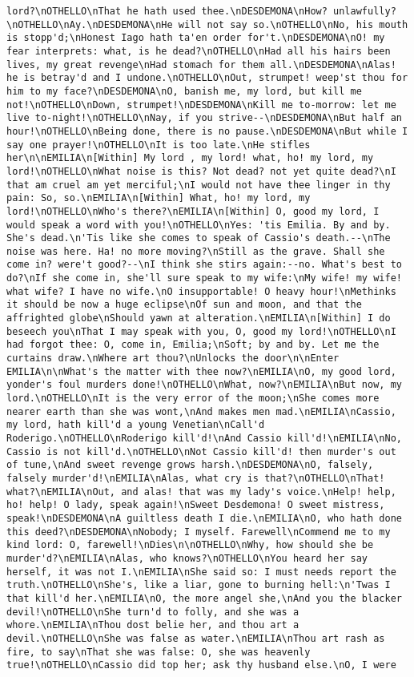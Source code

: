 \begin{verbatim}
lord?\nOTHELLO\nThat he hath used thee.\nDESDEMONA\nHow? unlawfully?\nOTHELLO\nAy.\nDESDEMONA\nHe will not say so.\nOTHELLO\nNo, his mouth is stopp'd;\nHonest Iago hath ta'en order for't.\nDESDEMONA\nO! my fear interprets: what, is he dead?\nOTHELLO\nHad all his hairs been lives, my great revenge\nHad stomach for them all.\nDESDEMONA\nAlas! he is betray'd and I undone.\nOTHELLO\nOut, strumpet! weep'st thou for him to my face?\nDESDEMONA\nO, banish me, my lord, but kill me not!\nOTHELLO\nDown, strumpet!\nDESDEMONA\nKill me to-morrow: let me live to-night!\nOTHELLO\nNay, if you strive--\nDESDEMONA\nBut half an hour!\nOTHELLO\nBeing done, there is no pause.\nDESDEMONA\nBut while I say one prayer!\nOTHELLO\nIt is too late.\nHe stifles her\n\nEMILIA\n[Within] My lord , my lord! what, ho! my lord, my lord!\nOTHELLO\nWhat noise is this? Not dead? not yet quite dead?\nI that am cruel am yet merciful;\nI would not have thee linger in thy pain: So, so.\nEMILIA\n[Within] What, ho! my lord, my lord!\nOTHELLO\nWho's there?\nEMILIA\n[Within] O, good my lord, I would speak a word with you!\nOTHELLO\nYes: 'tis Emilia. By and by. She's dead.\n'Tis like she comes to speak of Cassio's death.--\nThe noise was here. Ha! no more moving?\nStill as the grave. Shall she come in? were't good?--\nI think she stirs again:--no. What's best to do?\nIf she come in, she'll sure speak to my wife:\nMy wife! my wife! what wife? I have no wife.\nO insupportable! O heavy hour!\nMethinks it should be now a huge eclipse\nOf sun and moon, and that the affrighted globe\nShould yawn at alteration.\nEMILIA\n[Within] I do beseech you\nThat I may speak with you, O, good my lord!\nOTHELLO\nI had forgot thee: O, come in, Emilia;\nSoft; by and by. Let me the curtains draw.\nWhere art thou?\nUnlocks the door\n\nEnter EMILIA\n\nWhat's the matter with thee now?\nEMILIA\nO, my good lord, yonder's foul murders done!\nOTHELLO\nWhat, now?\nEMILIA\nBut now, my lord.\nOTHELLO\nIt is the very error of the moon;\nShe comes more nearer earth than she was wont,\nAnd makes men mad.\nEMILIA\nCassio, my lord, hath kill'd a young Venetian\nCall'd Roderigo.\nOTHELLO\nRoderigo kill'd!\nAnd Cassio kill'd!\nEMILIA\nNo, Cassio is not kill'd.\nOTHELLO\nNot Cassio kill'd! then murder's out of tune,\nAnd sweet revenge grows harsh.\nDESDEMONA\nO, falsely, falsely murder'd!\nEMILIA\nAlas, what cry is that?\nOTHELLO\nThat! what?\nEMILIA\nOut, and alas! that was my lady's voice.\nHelp! help, ho! help! O lady, speak again!\nSweet Desdemona! O sweet mistress, speak!\nDESDEMONA\nA guiltless death I die.\nEMILIA\nO, who hath done this deed?\nDESDEMONA\nNobody; I myself. Farewell\nCommend me to my kind lord: O, farewell!\nDies\n\nOTHELLO\nWhy, how should she be murder'd?\nEMILIA\nAlas, who knows?\nOTHELLO\nYou heard her say herself, it was not I.\nEMILIA\nShe said so: I must needs report the truth.\nOTHELLO\nShe's, like a liar, gone to burning hell:\n'Twas I that kill'd her.\nEMILIA\nO, the more angel she,\nAnd you the blacker devil!\nOTHELLO\nShe turn'd to folly, and she was a whore.\nEMILIA\nThou dost belie her, and thou art a devil.\nOTHELLO\nShe was false as water.\nEMILIA\nThou art rash as fire, to say\nThat she was false: O, she was heavenly true!\nOTHELLO\nCassio did top her; ask thy husband else.\nO, I were 
\end{verbatim}
